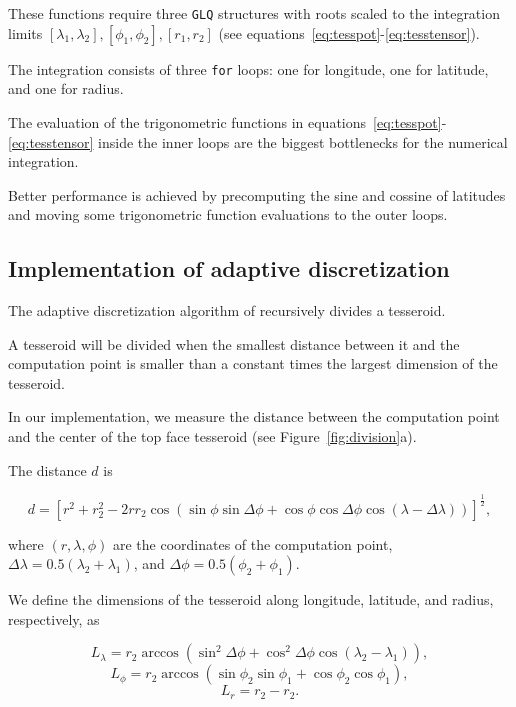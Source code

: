 \documentclass[manuscript]{geophysics}
\begin{document}
These functions require three \texttt{GLQ} structures with roots scaled to the
integration limits $[\lambda_1, \lambda_2], [\phi_1, \phi_2], [r_1, r_2]$
(see equations~\ref{eq:tesspot}-\ref{eq:tesstensor}).

The integration consists of three \texttt{for} loops: one for longitude, one
for latitude, and one for radius.

The evaluation of the trigonometric functions in
equations~\ref{eq:tesspot}-\ref{eq:tesstensor} inside the inner loops
are the biggest bottlenecks for the numerical integration.

Better performance is achieved by
precomputing the sine and cossine of latitudes
and moving some trigonometric function
evaluations to the outer loops.



\subsection{Implementation of adaptive discretization}


The adaptive discretization algorithm of \citet{Li2011} recursively
divides a tesseroid.

A tesseroid will be divided when the smallest distance between it and the
computation point is smaller than a constant times the largest dimension of the
tesseroid.

In our implementation,
we measure the distance between
the computation point
and the center of the top face tesseroid
(see Figure~\ref{fig:division}a).

The distance $d$ is

\begin{equation}
    d = \left[
        r^2 + r_2^2 - 2 r r_2
        \cos(\sin\phi\sin\Delta\phi + \cos\phi\cos\Delta\phi
            \cos(\lambda - \Delta\lambda))
        \right]^{\frac{1}{2}},
    \label{eq:distance}
\end{equation}

where
$(r, \lambda, \phi)$ are the coordinates of the computation point,
$\Delta\lambda = 0.5(\lambda_2 + \lambda_1)$,
and
$\Delta\phi = 0.5(\phi_2 + \phi_1)$.

We define the dimensions of the tesseroid
along longitude, latitude, and radius, respectively, as

\begin{equation}
    L_\lambda = r_2 \arccos(\sin^2\Delta\phi +
        \cos^2\Delta\phi\cos(\lambda_2 - \lambda_1)),
    \label{eq:sizelon}
\end{equation}
\begin{equation}
    L_\phi = r_2 \arccos(\sin\phi_2\sin\phi_1 + \cos\phi_2\cos\phi_1),
\end{equation}
\begin{equation}
    L_r = r_2 - r_2.
    \label{eq:sizer}
\end{equation}
\end{document}
